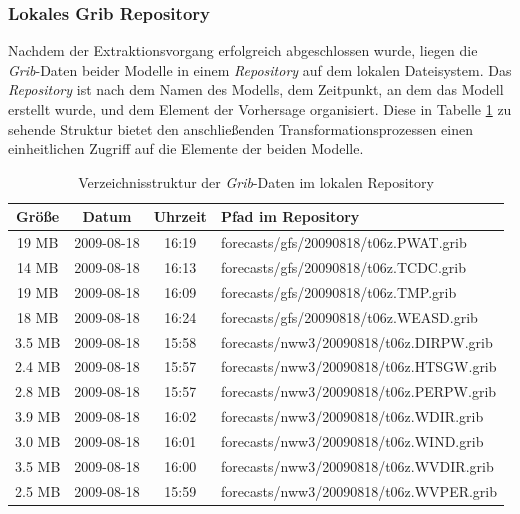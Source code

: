 \subsubsection{Lokales Grib Repository}
Nachdem der Extraktionsvorgang erfolgreich abgeschlossen wurde, liegen
die \textit{Grib}-Daten beider Modelle in einem \textit{Repository}
auf dem lokalen Dateisystem. Das \textit{Repository} ist nach dem
Namen des Modells, dem Zeitpunkt, an dem das Modell erstellt wurde,
und dem Element der Vorhersage organisiert. Diese in Tabelle
\ref{tab:repository} zu sehende Struktur bietet den anschließenden
Transformationsprozessen einen einheitlichen Zugriff auf die Elemente
der beiden Modelle.

\begin{table}
  \centering
  {\sf
    \footnotesize
    \begin{longtable}{@{}cccl}
      \toprule
      \textbf{Größe} & \textbf{Datum} & \textbf{Uhrzeit} & \textbf{Pfad im Repository} \\
      \midrule
      19 MB & 2009-08-18 & 16:19 & forecasts/gfs/20090818/t06z.PWAT.grib \\
      14 MB & 2009-08-18 & 16:13 & forecasts/gfs/20090818/t06z.TCDC.grib \\
      19 MB & 2009-08-18 & 16:09 & forecasts/gfs/20090818/t06z.TMP.grib \\
      18 MB & 2009-08-18 & 16:24 & forecasts/gfs/20090818/t06z.WEASD.grib \\
      \midrule
      3.5 MB & 2009-08-18 & 15:58 & forecasts/nww3/20090818/t06z.DIRPW.grib \\
      2.4 MB & 2009-08-18 & 15:57 & forecasts/nww3/20090818/t06z.HTSGW.grib \\
      2.8 MB & 2009-08-18 & 15:57 & forecasts/nww3/20090818/t06z.PERPW.grib \\
      3.9 MB & 2009-08-18 & 16:02 & forecasts/nww3/20090818/t06z.WDIR.grib \\
      3.0 MB & 2009-08-18 & 16:01 & forecasts/nww3/20090818/t06z.WIND.grib \\
      3.5 MB & 2009-08-18 & 16:00 & forecasts/nww3/20090818/t06z.WVDIR.grib \\
      2.5 MB & 2009-08-18 & 15:59 & forecasts/nww3/20090818/t06z.WVPER.grib \\
      \bottomrule
    \end{longtable}
  }
  \caption{Verzeichnisstruktur der \textit{Grib}-Daten im lokalen Repository}
  \label{tab:repository}
\end{table}

